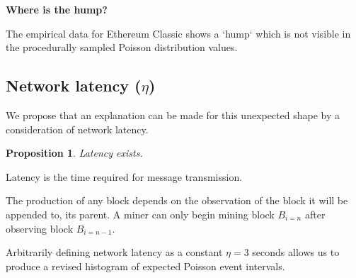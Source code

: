 \documentclass[11pt]{article}
\theoremstyle{plain}
\newtheorem{proposition}{Proposition}[section]
\begin{document}

%

\clearpage

\textbf{Where is the hump?}

The empirical data for Ethereum Classic shows a `hump` which is not visible in the
procedurally sampled Poisson distribution values.

\subsection{\normalsize{Network latency ($\eta$)}}

We propose that an explanation can be made for this unexpected shape
by a consideration of network latency.

\vspace{5mm}
\begin{proposition}
    Latency exists.
\end{proposition}

Latency is the time required for message transmission.

The production of any block depends on the observation of the block it will be appended to, its parent.
A miner can only begin mining block $B_{i=n}$ after observing block $B_{i=n-1}$.

Arbitrarily defining network latency as a constant $\eta=3$ seconds allows us
to produce a revised histogram of expected Poisson event intervals.
\end{document}
